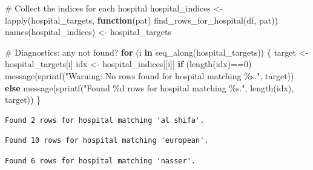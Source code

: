 \documentclass[
  letterpaper,
  DIV=11,
  numbers=noendperiod]{scrartcl}
\newenvironment{Shaded}{\begin{snugshade}}{\end{snugshade}}
\newcommand{\CommentTok}[1]{\textcolor[rgb]{0.37,0.37,0.37}{#1}}
\newcommand{\ControlFlowTok}[1]{\textcolor[rgb]{0.00,0.23,0.31}{\textbf{#1}}}
\newcommand{\DecValTok}[1]{\textcolor[rgb]{0.68,0.00,0.00}{#1}}
\newcommand{\FunctionTok}[1]{\textcolor[rgb]{0.28,0.35,0.67}{#1}}
\newcommand{\NormalTok}[1]{\textcolor[rgb]{0.00,0.23,0.31}{#1}}
\newcommand{\OtherTok}[1]{\textcolor[rgb]{0.00,0.23,0.31}{#1}}
\newcommand{\SpecialCharTok}[1]{\textcolor[rgb]{0.37,0.37,0.37}{#1}}
\newcommand{\StringTok}[1]{\textcolor[rgb]{0.13,0.47,0.30}{#1}}
\begin{document}
\begin{Shaded}
\begin{Highlighting}[]
\CommentTok{\# Collect the indices for each hospital}
\NormalTok{hospital\_indices }\OtherTok{\textless{}{-}} \FunctionTok{lapply}\NormalTok{(hospital\_targets, }\ControlFlowTok{function}\NormalTok{(pat) }\FunctionTok{find\_rows\_for\_hospital}\NormalTok{(df, pat))}
\FunctionTok{names}\NormalTok{(hospital\_indices) }\OtherTok{\textless{}{-}}\NormalTok{ hospital\_targets}

\CommentTok{\# Diagnostics: any not found?}
\ControlFlowTok{for}\NormalTok{ (i }\ControlFlowTok{in} \FunctionTok{seq\_along}\NormalTok{(hospital\_targets)) \{}
\NormalTok{  target }\OtherTok{\textless{}{-}}\NormalTok{ hospital\_targets[i]}
\NormalTok{  idx }\OtherTok{\textless{}{-}}\NormalTok{ hospital\_indices[[i]]}
  \ControlFlowTok{if}\NormalTok{ (}\FunctionTok{length}\NormalTok{(idx)}\SpecialCharTok{==}\DecValTok{0}\NormalTok{) }\FunctionTok{message}\NormalTok{(}\FunctionTok{sprintf}\NormalTok{(}\StringTok{"Warning: No rows found for hospital matching \textquotesingle{}\%s\textquotesingle{}."}\NormalTok{, target))}
  \ControlFlowTok{else} \FunctionTok{message}\NormalTok{(}\FunctionTok{sprintf}\NormalTok{(}\StringTok{"Found \%d rows for hospital matching \textquotesingle{}\%s\textquotesingle{}."}\NormalTok{, }\FunctionTok{length}\NormalTok{(idx), target))}
\NormalTok{\}}
\end{Highlighting}
\end{Shaded}

\begin{verbatim}
Found 2 rows for hospital matching 'al shifa'.
\end{verbatim}

\begin{verbatim}
Found 10 rows for hospital matching 'european'.
\end{verbatim}

\begin{verbatim}
Found 6 rows for hospital matching 'nasser'.
\end{verbatim}
\end{document}
